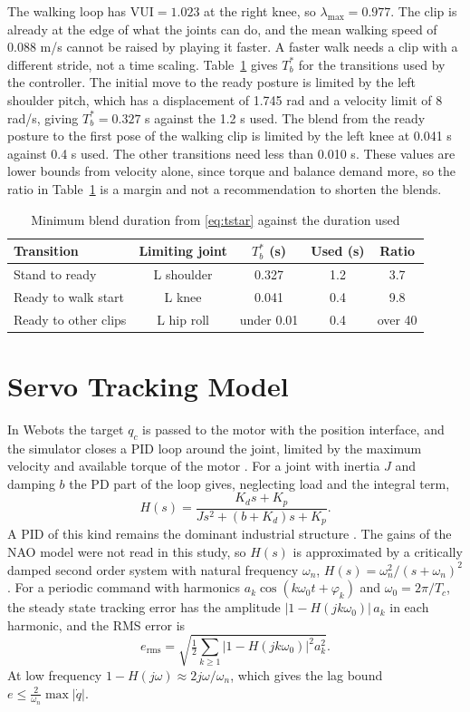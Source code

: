 \documentclass[10pt,journal]{IEEEtran}
\begin{document}
The walking loop has $\mathrm{VUI}=1.023$ at the right knee, so $\lambda_{\max}=0.977$. The clip is already at the edge of what the joints can do, and the mean walking speed of 0.088 m/s cannot be raised by playing it faster. A faster walk needs a clip with a different stride, not a time scaling. Table~\ref{tab:tstar} gives $T_b^{*}$ for the transitions used by the controller. The initial move to the ready posture is limited by the left shoulder pitch, which has a displacement of 1.745 rad and a velocity limit of 8 rad/s, giving $T_b^{*}=0.327$ s against the 1.2 s used. The blend from the ready posture to the first pose of the walking clip is limited by the left knee at 0.041 s against 0.4 s used. The other transitions need less than 0.010 s. These values are lower bounds from velocity alone, since torque and balance demand more, so the ratio in Table~\ref{tab:tstar} is a margin and not a recommendation to shorten the blends.

\begin{table}[t]
\centering
\caption{Minimum blend duration from \eqref{eq:tstar} against the duration used}
\label{tab:tstar}
\footnotesize
\setlength{\tabcolsep}{3pt}
\begin{tabular}{lcccc}
\toprule
Transition & Limiting joint & $T_b^{*}$ (s) & Used (s) & Ratio\\
\midrule
Stand to ready & L shoulder & 0.327 & 1.2 & 3.7\\
Ready to walk start & L knee & 0.041 & 0.4 & 9.8\\
Ready to other clips & L hip roll & under 0.01 & 0.4 & over 40\\
\bottomrule
\end{tabular}
\end{table}

\section{Servo Tracking Model}
In Webots the target $q_c$ is passed to the motor with the position interface, and the simulator closes a PID loop around the joint, limited by the maximum velocity and available torque of the motor \cite{webotsmanual}. For a joint with inertia $J$ and damping $b$ the PD part of the loop gives, neglecting load and the integral term,
\begin{equation}
H(s)=\frac{K_d s+K_p}{Js^2+(b+K_d)s+K_p}.
\label{eq:H}
\end{equation}
A PID of this kind remains the dominant industrial structure \cite{astrom2001}. The gains of the NAO model were not read in this study, so $H(s)$ is approximated by a critically damped second order system with natural frequency $\omega_n$, $H(s)=\omega_n^2/(s+\omega_n)^2$. For a periodic command with harmonics $a_k\cos(k\omega_0 t+\varphi_k)$ and $\omega_0=2\pi/T_c$, the steady state tracking error has the amplitude $\lvert 1-H(jk\omega_0)\rvert\,a_k$ in each harmonic, and the RMS error is
\begin{equation}
e_{\mathrm{rms}}=\sqrt{\tfrac12\sum_{k\ge1}\lvert 1-H(jk\omega_0)\rvert^2a_k^2}.
\label{eq:erms}
\end{equation}
At low frequency $1-H(j\omega)\approx 2j\omega/\omega_n$, which gives the lag bound $e\le \tfrac{2}{\omega_n}\max\lvert\dot q\rvert$.
\end{document}
